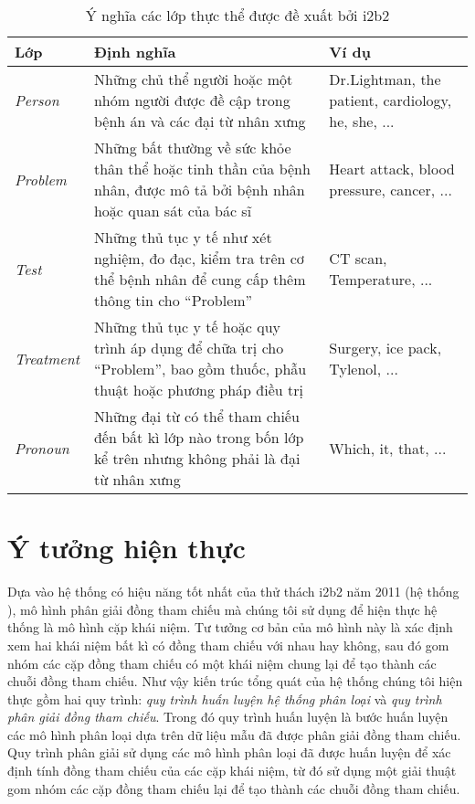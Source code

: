 \begin{table}[th]
\centering{}
\caption{Ý nghĩa các lớp thực thể được đề xuất bởi i2b2\label{tab:EntityLabels}}
\footnotesize\sffamily

\begin{tabularx}{\textwidth}{@{}lLP{\colleft}{0.3}@{}}
\toprule
\textbf{Lớp} & \textbf{Định nghĩa} & \textbf{Ví dụ}\\
\midrule
\emph{Person} & Những chủ thể người hoặc một nhóm người được đề cập trong bệnh án và các đại từ nhân xưng & Dr.Lightman, the patient, cardiology, he, she, ...\\
\emph{Problem} & Những bất thường về sức khỏe thân thể hoặc tinh thần của bệnh nhân, được mô tả bởi bệnh nhân hoặc quan sát của bác sĩ & Heart attack, blood pressure, cancer, ...\\
\emph{Test} & Những thủ tục y tế như xét nghiệm, đo đạc, kiểm tra trên cơ thể bệnh nhân để cung cấp thêm thông tin cho ``Problem'' & CT scan, Temperature, ...\\
\emph{Treatment} & Những thủ tục y tế hoặc quy trình áp dụng để chữa trị cho ``Problem'', bao gồm thuốc, phẫu thuật hoặc phương pháp điều trị & Surgery, ice pack, Tylenol, ...\\
\emph{Pronoun} & Những đại từ có thể tham chiếu đến bất kì lớp nào trong bốn lớp kể trên nhưng không phải là đại từ nhân xưng & Which, it, that, ...\\
\bottomrule
\end{tabularx}
\end{table}

\section{Ý tưởng hiện thực\label{ytuonghienthuc}}
Dựa vào hệ thống có hiệu năng tốt nhất của thử thách i2b2 năm 2011 (hệ thống \cite{YanXu2012}), mô hình phân giải đồng tham chiếu mà chúng tôi sử dụng để hiện thực hệ thống là mô hình cặp khái niệm. Tư tưởng cơ bản của mô hình này là xác định xem hai khái niệm bất kì có đồng tham chiếu với nhau hay không, sau đó gom nhóm các cặp đồng tham chiếu có một khái niệm chung lại để tạo thành các chuỗi đồng tham chiếu. Như vậy kiến trúc tổng quát của hệ thống chúng tôi hiện thực gồm hai quy trình: \emph{quy trình huấn luyện hệ thống phân loại} và \emph{quy trình phân giải đồng tham chiếu}. Trong đó quy trình huấn luyện là bước huấn luyện các mô hình phân loại dựa trên dữ liệu mẫu đã được phân giải đồng tham chiếu. Quy trình phân giải sử dụng các mô hình phân loại đã được huấn luyện để xác định tính đồng tham chiếu của các cặp khái niệm, từ đó sử dụng một giải thuật gom nhóm các cặp đồng tham chiếu lại để tạo thành các chuỗi đồng tham chiếu.

